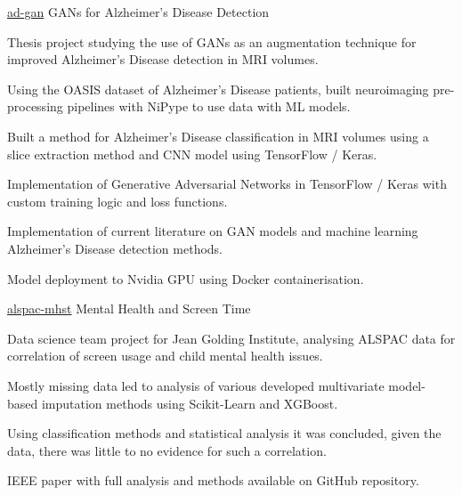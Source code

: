 \vspace{-0.1cm}

\begin{cvprojects}

\cvproject
    {\href{https://github.com/kaihulme/ad-gan}{\faGithubSquare\acvHeaderIconSep ad-gan}} %
    {GANs for Alzheimer's Disease Detection} %
    {\begin{cvitems}
        \item Thesis project studying the use of GANs as an augmentation technique for improved Alzheimer’s Disease detection in MRI volumes.
        \item Using the OASIS dataset of Alzheimer's Disease patients, built neuroimaging pre-processing pipelines with NiPype to use data with ML models.
        \item Built a method for Alzheimer's Disease classification in MRI volumes using a slice extraction method and CNN model using TensorFlow / Keras.
        \item Implementation of Generative Adversarial Networks in TensorFlow / Keras with custom training logic and loss functions.
        \item Implementation of current literature on GAN models and machine learning Alzheimer's Disease detection methods.
        \item Model deployment to Nvidia GPU using Docker containerisation.
      \end{cvitems}
    }
    
\cvproject
    {\href{https://github.com/kaihulme/alspac-mhst}{\faGithubSquare\acvHeaderIconSep alspac-mhst}} %
    {Mental Health and Screen Time} %
    {\begin{cvitems}
        \item Data science team project for Jean Golding Institute, analysing ALSPAC data for correlation of screen usage and child mental health issues.
        \item Mostly missing data led to analysis of various developed multivariate model-based imputation methods using Scikit-Learn and XGBoost.
        \item Using classification methods and statistical analysis it was concluded, given the data, there was little to no evidence for such a correlation.
        \item IEEE paper with full analysis and methods available on GitHub repository.
      \end{cvitems}
    }
    

\end{cvprojects}
